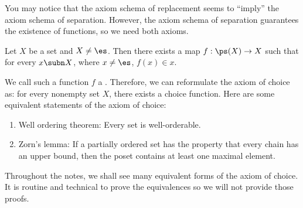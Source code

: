 \documentclass[10pt]{article}
\begin{document}
\par
You may notice that the axiom schema of replacement seems to ``imply'' the axiom schema of separation. However, the axiom schema of separation guarantees the existence of functions, so we need both axioms.
\begin{Axiom of choice}
    Let $X$ be a set and $X\ne\es$. Then there exists a map $f:\ps(X)\to X$ such that for every $x\subn X$, where $x\ne\es$, $f(x)\in x$. 
\end{Axiom of choice}
\par
We call such a function $f$ a . Therefore, we can reformulate the axiom of choice as: for every nonempty set $X$, there exists a choice function. Here are some equivalent statements of the axiom of choice:
\begin{enumerate}
    \item Well ordering theorem: Every set is well-orderable.
    \item Zorn's lemma: If a partially ordered set has the property that every chain has an upper bound, then the poset contains at least one maximal element.
\end{enumerate}
\begin{remark}
    Throughout the notes, we shall see many equivalent forms of the axiom of choice. It is routine and technical to prove the equivalences so we will not provide those proofs.
\end{remark}
\end{document}
